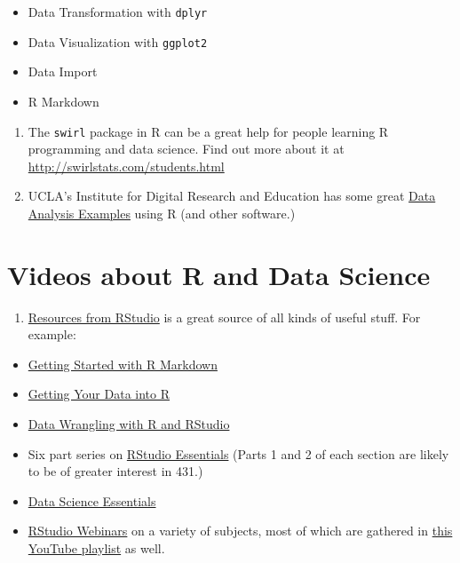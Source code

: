 \documentclass[
]{book}
\providecommand{\tightlist}{%
  \setlength{\itemsep}{0pt}\setlength{\parskip}{0pt}}
\begin{document}
\begin{itemize}
\tightlist
\item
  Data Transformation with \texttt{dplyr}
\item
  Data Visualization with \texttt{ggplot2}
\item
  Data Import
\item
  R Markdown
\end{itemize}

\begin{enumerate}
\def\labelenumi{\arabic{enumi}.}
\setcounter{enumi}{2}
\tightlist
\item
  The \texttt{swirl} package in R can be a great help for people learning R programming and data science. Find out more about it at \url{http://swirlstats.com/students.html}
\item
  UCLA's Institute for Digital Research and Education has some great \href{https://stats.idre.ucla.edu/other/dae/}{Data Analysis Examples} using R (and other software.)
\end{enumerate}

\hypertarget{videos-about-r-and-data-science}{%
\section{Videos about R and Data Science}\label{videos-about-r-and-data-science}}

\begin{enumerate}
\def\labelenumi{\arabic{enumi}.}
\tightlist
\item
  \href{https://resources.rstudio.com/}{Resources from RStudio} is a great source of all kinds of useful stuff. For example:
\end{enumerate}

\begin{itemize}
\tightlist
\item
  \href{https://www.rstudio.com/resources/webinars/getting-started-with-r-markdown/}{Getting Started with R Markdown}
\item
  \href{https://www.rstudio.com/resources/webinars/getting-your-data-into-r/}{Getting Your Data into R}
\item
  \href{https://www.rstudio.com/resources/webinars/data-wrangling-with-r-and-rstudio/}{Data Wrangling with R and RStudio}
\item
  Six part series on \href{https://www.rstudio.com/resources/webinars/rstudio-essentials-webinar-series-part-1/}{RStudio Essentials} (Parts 1 and 2 of each section are likely to be of greater interest in 431.)
\item
  \href{https://resources.rstudio.com/the-essentials-of-data-science}{Data Science Essentials}
\item
  \href{https://resources.rstudio.com/webinars}{RStudio Webinars} on a variety of subjects, most of which are gathered in \href{https://www.youtube.com/playlist?list=PL9HYL-VRX0oRDOP3T5ojgSnMtQdityqEk}{this YouTube playlist} as well.
\end{itemize}
\end{document}
